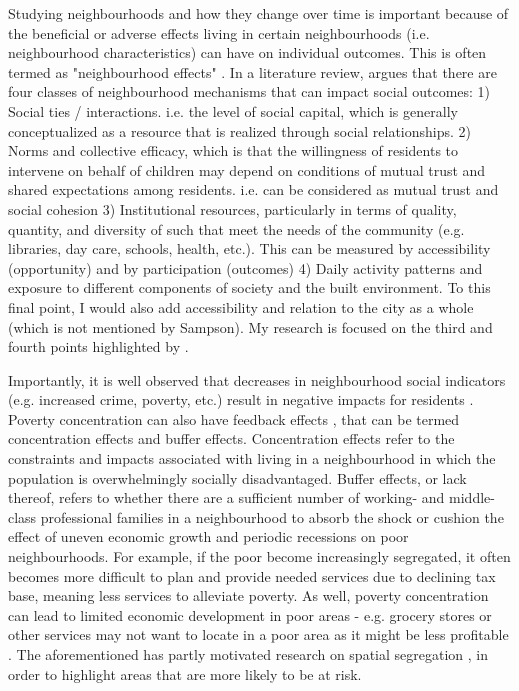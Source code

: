 Studying neighbourhoods and how they change over time is important because of the beneficial or adverse effects living in certain neighbourhoods (i.e. neighbourhood characteristics) can have on individual outcomes. This is often termed as "neighbourhood effects" \cite{sampson_assessing_2002}. In a literature review,  argues that there are four classes of neighbourhood mechanisms that can impact social outcomes:
1) Social ties / interactions. i.e. the level of social capital, which is generally conceptualized as a resource that is realized through social relationships.
2) Norms and collective efficacy, which is that the willingness of residents to intervene on behalf of children may depend on conditions of mutual trust and shared expectations among residents. i.e. can be considered as mutual trust and social cohesion
3) Institutional resources, particularly in terms of quality, quantity, and diversity of such that meet the needs of the community (e.g. libraries, day care, schools, health, etc.). This can be measured by accessibility (opportunity) and by participation (outcomes)
4) Daily activity patterns and exposure to different components of society and the built environment. To this final point, I would also add accessibility and relation to the city as a whole (which is not mentioned by Sampson). My research is focused on the third and fourth points highlighted by .


Importantly, it is well observed that decreases in neighbourhood social indicators (e.g. increased crime, poverty, etc.) result in negative impacts for  residents  \cite{sampson_assessing_2002}. Poverty concentration can also have feedback effects \cite{wilson_truly_2012}, that can be termed concentration effects and buffer effects. Concentration effects refer to the constraints and impacts associated with living in a neighbourhood in which the population is overwhelmingly socially disadvantaged. Buffer effects, or lack thereof, refers to whether there are a sufficient number of working- and middle-class professional families in a neighbourhood to absorb the shock or cushion the effect of uneven economic growth and periodic recessions on poor neighbourhoods. For example, if the poor become increasingly segregated, it often becomes more difficult to plan and provide needed services due to declining tax base, meaning less services to alleviate poverty. As well, poverty concentration can lead to limited economic development in poor areas - e.g. grocery stores or other services may not want to locate in a poor area as it might be less profitable \cite{ades_are_2012}. The aforementioned has partly motivated research on spatial segregation \cite{massey_dimensions_1988}, in order to highlight areas that are more likely to be at risk.

